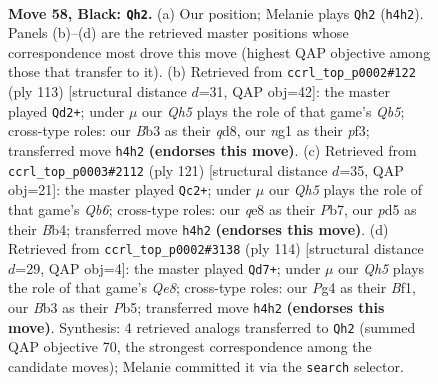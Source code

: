 \documentclass[11pt]{article}
\begin{document}
\clearpage

\begin{figure}[p]\centering
\begin{subfigure}{0.46\textwidth}\centering
\resizebox{\linewidth}{!}{%
\newchessgame
\chessboard[
  setfen={4Q3/7k/p3P3/3P3p/6pq/Nb6/5P2/5KN1 b - - 0 58},
  showmover=false,
  pgfstyle=straightmove, color=movearrow, markmove={h4-h2}
]}
\caption{}
\end{subfigure}\hfill
\begin{subfigure}{0.46\textwidth}\centering
\resizebox{\linewidth}{!}{%
\newchessgame
\chessboard[
  setfen={3Q4/6k1/3P1p2/1p4p1/1q1p2P1/5P2/6K1/8 b - - 0 57},
  showmover=false,
  pgfstyle=straightmove, color=movearrow, markmove={b4-d2}
]}
\caption{}
\end{subfigure}
\\[4pt]
\begin{subfigure}{0.46\textwidth}\centering
\resizebox{\linewidth}{!}{%
\newchessgame
\chessboard[
  setfen={8/kp2P3/8/p6P/Pb3Q2/1q1p2N1/6K1/8 b - - 0 61},
  showmover=false,
  pgfstyle=straightmove, color=movearrow, markmove={b3-c2}
]}
\caption{}
\end{subfigure}\hfill
\begin{subfigure}{0.46\textwidth}\centering
\resizebox{\linewidth}{!}{%
\newchessgame
\chessboard[
  setfen={4Q3/p5k1/1p4p1/1P6/P4nP1/5K2/7P/2q2B2 w - - 17 58},
  showmover=false,
  pgfstyle=straightmove, color=movearrow, markmove={e8-d7}
]}
\caption{}
\end{subfigure}
\caption{\textbf{Move 58, Black: \texttt{Qh2}.} (a) Our position; Melanie plays \texttt{Qh2} (\texttt{h4h2}). Panels (b)--(d) are the retrieved master positions whose correspondence most drove this move (highest QAP objective among those that transfer to it). (b) Retrieved from \texttt{ccrl\_top\_p0002\#122} (ply 113) [structural distance $d$=31, QAP obj=42]: the master played \texttt{Qd2+}; under $\mu$ our \emph{Qh5} plays the role of that game's \emph{Qb5}; cross-type roles: our \emph{B}b3 as their \emph{q}d8, our \emph{n}g1 as their \emph{p}f3; transferred move \texttt{h4h2} \textbf{(endorses this move)}. (c) Retrieved from \texttt{ccrl\_top\_p0003\#2112} (ply 121) [structural distance $d$=35, QAP obj=21]: the master played \texttt{Qc2+}; under $\mu$ our \emph{Qh5} plays the role of that game's \emph{Qb6}; cross-type roles: our \emph{q}e8 as their \emph{P}b7, our \emph{p}d5 as their \emph{B}b4; transferred move \texttt{h4h2} \textbf{(endorses this move)}. (d) Retrieved from \texttt{ccrl\_top\_p0002\#3138} (ply 114) [structural distance $d$=29, QAP obj=4]: the master played \texttt{Qd7+}; under $\mu$ our \emph{Qh5} plays the role of that game's \emph{Qe8}; cross-type roles: our \emph{P}g4 as their \emph{B}f1, our \emph{B}b3 as their \emph{P}b5; transferred move \texttt{h4h2} \textbf{(endorses this move)}. Synthesis: 4 retrieved analogs transferred to \texttt{Qh2} (summed QAP objective 70, the strongest correspondence among the candidate moves); Melanie committed it via the \texttt{search} selector.}
\label{fig:thought-m115}
\end{figure}
\end{document}
